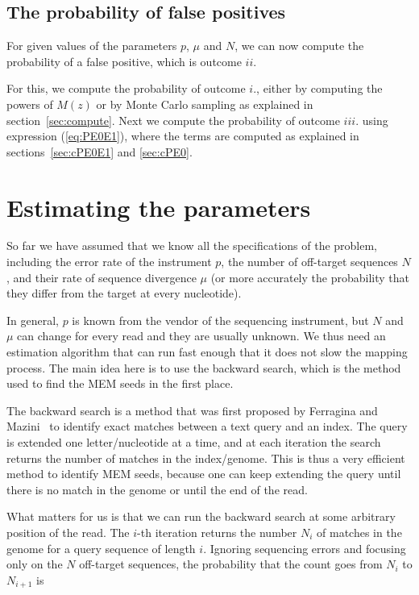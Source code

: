 \documentclass{article}
\begin{document}
\subsection{The probability of false positives}

For given values of the parameters $p$, $\mu$ and $N$, we can now compute
the probability of a false positive, which is outcome $ii$.

For this, we compute the probability of outcome $i.$, either by computing
the powers of $M(z)$ or by Monte Carlo sampling as explained in
section~\ref{sec:compute}. Next we compute the probability of outcome
$iii.$ using expression (\ref{eq:PE0E1}), where the terms are computed as
explained in sections~\ref{sec:cPE0E1} and \ref{sec:cPE0}.

\section{Estimating the parameters}
\label{sec:est}

So far we have assumed that we know all the specifications of the problem,
including the error rate of the instrument $p$, the number of off-target
sequences $N$, and their rate of sequence divergence $\mu$ (or more
accurately the probability that they differ from the target at every
nucleotide).

In general, $p$ is known from the vendor of the sequencing instrument, but
$N$ and $\mu$ can change for every read and they are usually unknown. We
thus need an estimation algorithm that can run fast enough that it does
not slow the mapping process. The main idea here is to use the backward
search, which is the method used to find the MEM seeds in the first place.

The backward search is a method that was first proposed by Ferragina and
Mazini~\cite{ferragina2000opportunistic} to identify exact matches between
a text query and an index. The query is extended one letter/nucleotide at
a time, and at each iteration the search returns the number of matches in
the index/genome. This is thus a very efficient method to identify MEM
seeds, because one can keep extending the query until there is no match in
the genome or until the end of the read.

What matters for us is that we can run the backward search at some
arbitrary position of the read. The $i$-th iteration returns the number
$N_i$ of matches in the genome for a query sequence of length $i$.
Ignoring sequencing errors and focusing only on the $N$ off-target
sequences, the probability that the count goes from $N_i$ to $N_{i+1}$ is
\end{document}
